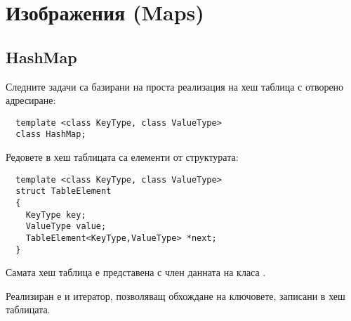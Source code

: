   \pagebreak

  \section {Изображения (Maps)}
  \subsection {HashMap}
  
  \begin{mdframed}[hidealllines=true,backgroundcolor=gray!20]
  Следните задачи са базирани на проста реализация на хеш таблица с отворено адресиране:
  \begin{verbatim}
  template <class KeyType, class ValueType>
  class HashMap;
  \end{verbatim}
  Редовете в хеш таблицата са елементи от структурата:
  \begin{verbatim}
  template <class KeyType, class ValueType>
  struct TableElement
  {
    KeyType key;
    ValueType value;
    TableElement<KeyType,ValueType> *next;
  }
  \end{verbatim}
  Самата хеш таблица е представена с член данната на класа  .

  Реализиран е и итератор, позволяващ обхождане на ключовете, записани в хеш таблицата.

  \end{mdframed}
  
